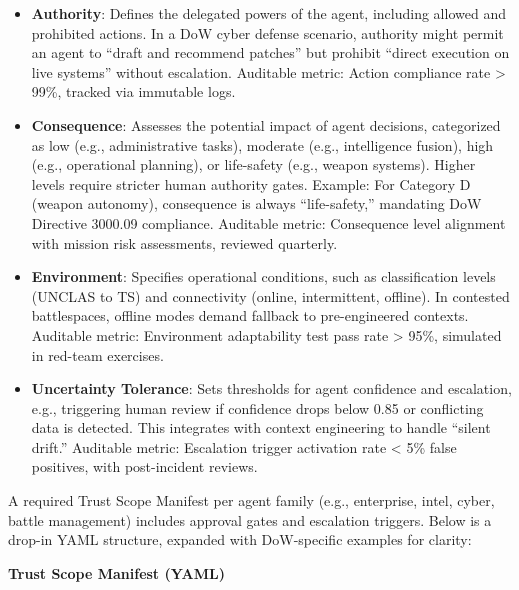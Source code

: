 \documentclass[11pt]{article}
\begin{document}
\begin{itemize}
\item
  \textbf{Authority}: Defines the delegated powers of the agent, including allowed and prohibited actions. In a DoW cyber defense scenario, authority might permit an agent to ``draft and recommend patches'' but prohibit ``direct execution on live systems'' without escalation. Auditable metric: Action compliance rate \textgreater{} 99\%, tracked via immutable logs.
\item
  \textbf{Consequence}: Assesses the potential impact of agent decisions, categorized as low (e.g., administrative tasks), moderate (e.g., intelligence fusion), high (e.g., operational planning), or life-safety (e.g., weapon systems). Higher levels require stricter human authority gates. Example: For Category D (weapon autonomy), consequence is always ``life-safety,'' mandating DoW Directive 3000.09 compliance. Auditable metric: Consequence level alignment with mission risk assessments, reviewed quarterly.
\item
  \textbf{Environment}: Specifies operational conditions, such as classification levels (UNCLAS to TS) and connectivity (online, intermittent, offline). In contested battlespaces, offline modes demand fallback to pre-engineered contexts. Auditable metric: Environment adaptability test pass rate \textgreater{} 95\%, simulated in red-team exercises.
\item
  \textbf{Uncertainty Tolerance}: Sets thresholds for agent confidence and escalation, e.g., triggering human review if confidence drops below 0.85 or conflicting data is detected. This integrates with context engineering to handle ``silent drift.'' Auditable metric: Escalation trigger activation rate \textless{} 5\% false positives, with post-incident reviews.
\end{itemize}

A required Trust Scope Manifest per agent family (e.g., enterprise, intel, cyber, battle management) includes approval gates and escalation triggers. Below is a drop-in YAML structure, expanded with DoW-specific examples for clarity:

\noindent\textcolor{BrandGray}{\small\textbf{Trust Scope Manifest (YAML)}}
\end{document}
